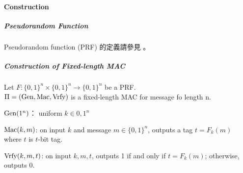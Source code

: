 \paragraph{Construction}

\subparagraph{Pseudorandom Function}

Pseudorandom function (PRF) 的定義請參見 。

\subparagraph{Construction of Fixed-length MAC}

Let \(F: \{0, 1\}^n \times \{0, 1\}^n \rightarrow \{0, 1\}^n\) be a PRF. \\
\(\Pi = (\operatorname{Gen}, \operatorname{\mathrm{Mac}}, \operatorname{\mathrm{Vrfy}})\) is a fixed-length MAC for message fo length n.
\begin{myItemize}
	\item \(\operatorname{Gen}(1^n)\)： uniform \(k \in {0, 1}^n\)
	\item \(\operatorname{\mathrm{Mac}}(k, m)\): on input \(k\) and message \(m \in \{0, 1\}^n\), outputs a tag \(t = F_k(m)\) where \(t\) is \(t\)-bit tag.
	\item \(\operatorname{\mathrm{Vrfy}}(k, m, t)\): on input \(k, m, t\), outputs 1 if and only if \(t = F_k(m)\); otherwise, outputs 0.
\end{myItemize}